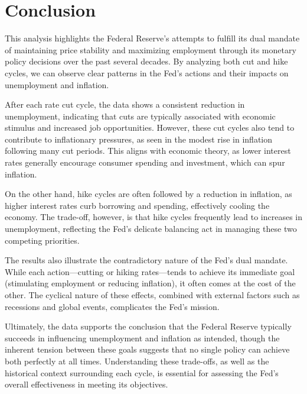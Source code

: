 \documentclass[
]{article}
\begin{document}
\section{Conclusion}\label{conclusion}

This analysis highlights the Federal Reserve's attempts to fulfill its
dual mandate of maintaining price stability and maximizing employment
through its monetary policy decisions over the past several decades. By
analyzing both cut and hike cycles, we can observe clear patterns in the
Fed's actions and their impacts on unemployment and inflation.

After each rate cut cycle, the data shows a consistent reduction in
unemployment, indicating that cuts are typically associated with
economic stimulus and increased job opportunities. However, these cut
cycles also tend to contribute to inflationary pressures, as seen in the
modest rise in inflation following many cut periods. This aligns with
economic theory, as lower interest rates generally encourage consumer
spending and investment, which can spur inflation.

On the other hand, hike cycles are often followed by a reduction in
inflation, as higher interest rates curb borrowing and spending,
effectively cooling the economy. The trade-off, however, is that hike
cycles frequently lead to increases in unemployment, reflecting the
Fed's delicate balancing act in managing these two competing priorities.

The results also illustrate the contradictory nature of the Fed's dual
mandate. While each action---cutting or hiking rates---tends to achieve
its immediate goal (stimulating employment or reducing inflation), it
often comes at the cost of the other. The cyclical nature of these
effects, combined with external factors such as recessions and global
events, complicates the Fed's mission.

Ultimately, the data supports the conclusion that the Federal Reserve
typically succeeds in influencing unemployment and inflation as
intended, though the inherent tension between these goals suggests that
no single policy can achieve both perfectly at all times. Understanding
these trade-offs, as well as the historical context surrounding each
cycle, is essential for assessing the Fed's overall effectiveness in
meeting its objectives.
\end{document}

